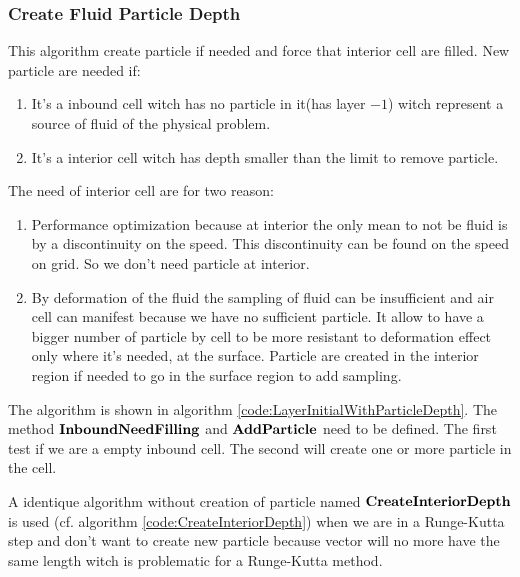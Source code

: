 \subsubsection{Create Fluid Particle Depth}

This algorithm create particle if needed and force that interior cell are filled.
New particle are needed if:
\begin{enumerate}
\item It's a inbound cell witch has no particle in it(has layer $-1$) witch represent a source of fluid of the physical problem.
\item It's a interior cell witch has depth smaller than the limit to remove particle.
\end{enumerate}

The need of interior cell are for two reason:
\begin{enumerate}
 \item Performance optimization because at interior the only mean to not be fluid is by a discontinuity on the speed.
 This discontinuity can be found on the speed on grid. So we don't need particle at interior.
 \item By deformation of the fluid the sampling of fluid can be insufficient and air cell can manifest because we have no sufficient particle.
 It allow to have a bigger number of particle by cell to be more resistant to deformation effect only where it's needed,
 at the surface. Particle are created in the interior region if needed to go in the surface region to add sampling.
\end{enumerate}

The algorithm is shown in algorithm \ref{code:LayerInitialWithParticleDepth}.
The method $\mathop{\textbf{InboundNeedFilling}}$ and $\mathop{\textbf{AddParticle}}$ need to be defined.
The first test if we are a empty inbound cell. The second will create one or more particle in the cell.

A identique algorithm without creation of particle named $\mathop{\textbf{CreateInteriorDepth}}$
is used (cf. algorithm \ref{code:CreateInteriorDepth}) when we are in a Runge-Kutta step and don't want
to create new particle because vector will no more have the same length witch is problematic for a Runge-Kutta method.

